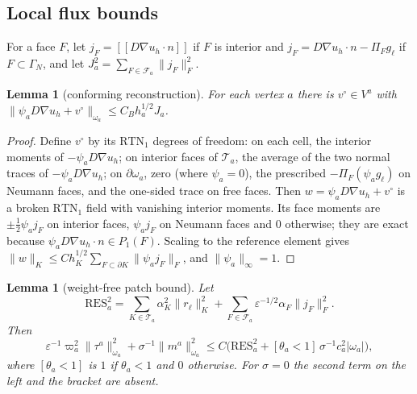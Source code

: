 \documentclass[11pt]{article}
\newcommand{\eps}{\varepsilon}
\newcommand{\RTN}{\mathrm{RTN}_1}
\newcommand{\jump}[1]{[\![#1]\!]}
\theoremstyle{plain}
\newtheorem{lemma}[theorem]{Lemma}
\theoremstyle{remark}
\numberwithin{equation}{section}
\begin{document}
\subsection{Local flux bounds}

For a face $F$, let $j_F=\jump{D\nabla u_h\cdot n}$ if $F$ is interior and
$j_F=D\nabla u_h\cdot n-\Pi_Fg_\ell$ if $F\subset\Gamma_N$, and let
$J_a^2=\sum_{F\in\mathcal F_a}\|j_F\|_F^2$.

\begin{lemma}[conforming reconstruction]\label{lem:B}
For each vertex $a$ there is $v^\circ\in V^a$ with
$\|\psi_aD\nabla u_h+v^\circ\|_{\omega_a}\le C_Bh_a^{1/2}J_a$.
\end{lemma}

\begin{proof}
Define $v^\circ$ by its $\RTN$ degrees of freedom: on each cell, the interior moments of
$-\psi_aD\nabla u_h$; on interior faces of $\mathcal T_a$, the average of the two normal traces of
$-\psi_aD\nabla u_h$; on $\partial\omega_a$, zero (where $\psi_a=0$), the prescribed
$-\Pi_F(\psi_ag_\ell)$ on Neumann faces, and the one-sided trace on free faces. Then
$w=\psi_aD\nabla u_h+v^\circ$ is a broken $\RTN$ field with vanishing interior moments. Its face
moments are $\pm\frac12\psi_aj_F$ on interior faces, $\psi_aj_F$ on Neumann faces and $0$
otherwise; they are exact because $\psi_aD\nabla u_h\cdot n\in P_1(F)$. Scaling to the reference
element gives $\|w\|_K\le Ch_K^{1/2}\sum_{F\subset\partial K}\|\psi_aj_F\|_F$, and
$\|\psi_a\|_\infty=1$.
\end{proof}

\begin{lemma}[weight-free patch bound]\label{lem:G}
Let
\[
  \mathrm{RES}_a^2=\sum_{K\in\mathcal T_a}\alpha_K^2\|r_\ell\|_K^2
  +\sum_{F\in\mathcal F_a}\eps^{-1/2}\alpha_F\|j_F\|_F^2.
\]
Then
\[
  \eps^{-1}\varpi_a^2\|\tau^a\|_{\omega_a}^2+\sigma^{-1}\|m^a\|_{\omega_a}^2
  \le C\bigl(\mathrm{RES}_a^2+[\theta_a<1]\,\sigma^{-1}c_a^2|\omega_a|\bigr),
\]
where $[\theta_a<1]$ is $1$ if $\theta_a<1$ and $0$ otherwise. For $\sigma=0$ the second term on the
left and the bracket are absent.
\end{lemma}
\end{document}
